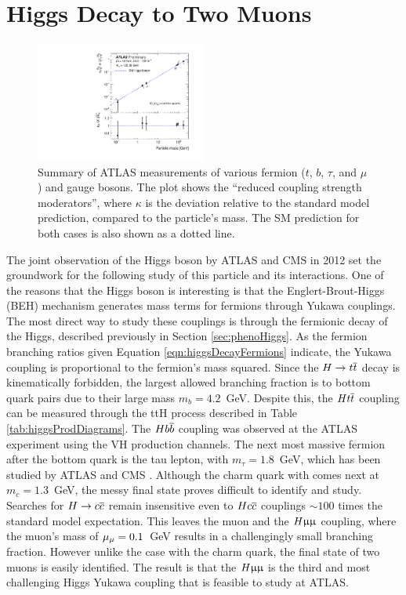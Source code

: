 \chapter{Higgs Decay to Two Muons}\label{sec:hmumu}

\begin{figure}[h!]
\captionsetup[subfigure]{position=b}
\centering
\includegraphics[width=0.5\textwidth]{figures/hmumu/massCouplingPlot.pdf}
\caption{Summary of ATLAS measurements of various fermion ($t$, $b$, $\tau$, and $\mu$) and gauge bosons. The plot shows the ``reduced coupling strength moderators'', where $\kappa$ is the deviation relative to the standard model prediction, compared to the particle's mass.
The SM prediction for both cases is also shown as a dotted line.
}
\label{fig:higgsMassCoupling}
\end{figure}

The joint observation of the Higgs boson by ATLAS \cite{atlashiggs} and CMS \cite{cmshiggs} in 2012 set the groundwork for the following study of this particle and its interactions.
One of the reasons that the Higgs boson is interesting is that the Englert-Brout-Higgs (BEH) mechanism generates mass terms for fermions through Yukawa couplings.
The most direct way to study these couplings is through the fermionic decay of the Higgs, described previously in Section \ref{sec:phenoHiggs}.
As the fermion branching ratios given Equation \ref{eqn:higgsDecayFermions} indicate, the Yukawa coupling is proportional to the fermion's mass squared.
Since the $H\to t\overline{t}$ decay is kinematically forbidden, the largest allowed branching fraction is to bottom quark pairs due to their large mass $m_b=4.2$~GeV. 
Despite this, the $Ht\overline{t}$ coupling can be measured through the ttH process described in Table \ref{tab:higgsProdDiagrams}.
The $Hb\overline{b}$ coupling was observed at the ATLAS experiment using the VH production channels. \cite{atlasHbb}
The next most massive fermion after the bottom quark is the tau lepton, with $m_\tau=1.8$~GeV, which has been studied by ATLAS \cite{atlasTauTau} and CMS \cite{cmsTauTau}.
Although the charm quark with comes next at $m_c=1.3$~GeV, the messy final state proves difficult to identify and study.
Searches for $H\to c\overline{c}$ remain insensitive even to $Hc\overline{c}$ couplings $\sim100$ times the standard model expectation.
This leaves the muon and the $H\upmu\upmu$ coupling, where the muon's mass of $\mu_\mu=0.1$~GeV results in a challengingly small branching fraction.
However unlike the case with the charm quark, the final state of two muons is easily identified.
The result is that the $H\upmu\upmu$ is the third and most challenging Higgs Yukawa coupling that is feasible to study at ATLAS.

